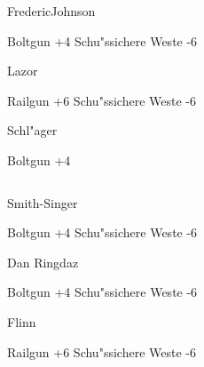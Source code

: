 \begin{column}[l]{0.45}
    \begin{nscsheet}[h]{Frederic\newline{}Johnson}
        \nscstats[ATT=3,AGG=4,EMP=4,KNO=5,HP=10]
        \nscruler
        \begin{nscinventory}
            \nscitem[Waffen] Boltgun +4
            \nscitem[R"ustung] Schu"ssichere Weste -6           
        \end{nscinventory}
    \end{nscsheet}

    \begin{nscsheet}[h]{Lazor}
        \nscstats[ATT=6,AGG=5,EMP=2,KNO=4,HP=12]
        \nscruler
        \begin{nscinventory}
            \nscitem[Waffen] Railgun +6
            \nscitem[R"ustung] Schu"ssichere Weste -6           
        \end{nscinventory}
    \end{nscsheet}


    \begin{nscsheet}[h]{Schl"ager}
        \nscstats[ATT=3,AGG=2,EMP=1,KNO=1,HP=10]
        \nscruler
        \begin{nscinventory}
            \nscitem[Waffen] Boltgun +4            
        \end{nscinventory}
    \end{nscsheet}    
\end{column}
\begin{column}[r]{0.45}
    \begin{nscsheet}[h]{Smith-Singer}
        \nscstats[ATT=7,AGG=7,EMP=7,KNO=5,HP=12]
        \nscruler
        \begin{nscinventory}
            \nscitem[Waffen] Boltgun +4
            \nscitem[R"ustung] Schu"ssichere Weste -6           
        \end{nscinventory}
    \end{nscsheet}

    \begin{nscsheet}[h]{Dan Ringdaz}
        \nscstats[ATT=4,AGG=4,EMP=4,KNO=5,HP=10]
        \nscruler
        \begin{nscinventory}
            \nscitem[Waffen] Boltgun +4
            \nscitem[R"ustung] Schu"ssichere Weste -6           
        \end{nscinventory}
    \end{nscsheet}

    \begin{nscsheet}[h]{Flinn}
        \nscstats[ATT=6,AGG=5,EMP=2,KNO=4,HP=12]
        \nscruler
        \begin{nscinventory}
            \nscitem[Waffen] Railgun +6
            \nscitem[R"ustung] Schu"ssichere Weste -6           
        \end{nscinventory}
    \end{nscsheet}
\end{column}
\vfill
\pagebreak

